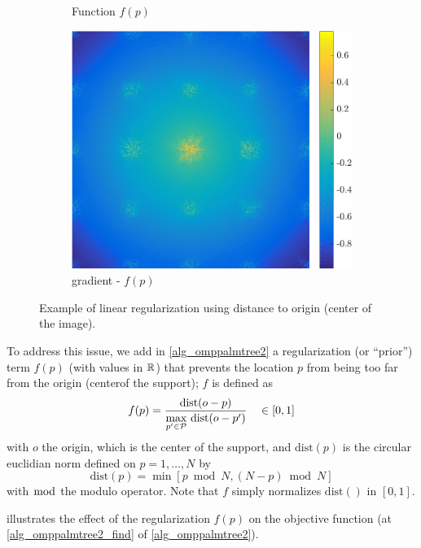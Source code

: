 \begin{figure}[!ht]
\begin{subfigure}[b]{0.325\textwidth}
\caption{Function $f(p)$}\label{}
\end{subfigure}
\begin{subfigure}[b]{0.325\textwidth}\centering
\includegraphics[width=1\textwidth]{figures/tree-scattered-supports/regularized.pdf}
\caption{gradient - $f(p)$}\label{}
\end{subfigure}
\caption{Example of linear regularization using distance to origin (center of the image).}\label{fig_grad_minus_dist}
\end{figure}

\noindent
To address this issue, we add in \cref{alg_omppalmtree2} a regularization (or “prior”) term $f(p)$ (with values in $\R$) that prevents the location $p$ from being too far from the origin (center\footnotemark[1] of the support); $f$ is defined as
\begin{equation}
f(p) = \frac{\text{dist}(o-p)}{\underset{p' \in \P}{\max}~\text{dist}(o-p')} \quad \in [0,1]\label{eq_regularize}
\end{equation}
with $o$ the origin, which is the center of the support, and $\text{dist}(p)$ is the circular euclidian norm defined on $p=1,\dots,N$ by\footnotemark[2]
\begin{equation*} \text{dist}(p) = \min\left[p \bmod N, (N-p) \bmod N\right]\end{equation*}
with $\bmod$ the modulo operator. Note that $f$ simply normalizes $\text{dist}()$ in $[0,1]$. 

\noindent
{} illustrates the effect of the regularization $f(p)$ on the objective function (at \cref{alg_omppalmtree2_find} of \cref{alg_omppalmtree2}).



